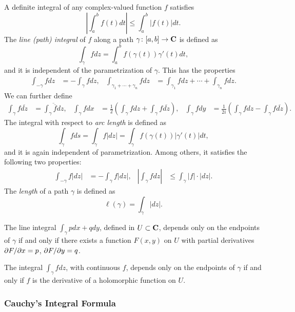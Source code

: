 A definite integral of any complex-valued function $f$ satisfies
\[
\left| \int_a^b f(t) d t \right| \leq \int_a^b |f(t)| d t.
\]
The \emph{line (path) integral} of $f$ along a path $\gamma \colon [a,b] \rightarrow \mathbf{C}$ is defined as
\[
\int_\gamma f d z = \int_a^b f(\gamma(t)) \gamma'(t) d t,
\]
and it is independent of the parametrization of $\gamma$. This has the properties
\begin{align*}
  \int_{-\gamma} f d z &= -\int_\gamma f d z, &
  \int_{\gamma_1 + \cdots + \gamma_n} f d z &= \int_{\gamma_1} f d z + \cdots + \int_{\gamma_n} f d z.
\end{align*}
We can further define
\begin{align*}
  \int_\gamma f \overline{d z} &= \overline{\int_\gamma \overline{f} d z}, &
  \int_\gamma f d x &= \frac{1}{2} \left( \int_\gamma f d z + \int_\gamma f \overline{d z} \right), &
  \int_\gamma f d y &= \frac{1}{2i} \left( \int_\gamma f d z - \int_\gamma f \overline{d z} \right).
\end{align*}
The integral with respect to \emph{arc length} is defined as
\[
\int_\gamma f d s = \int_\gamma f |d z| = \int_\gamma f(\gamma(t)) |\gamma'(t)| d t,
\]
and it is again independent of parametrization. Among others, it satisfies the following two properties:
\begin{align*}
  \int_{-\gamma} f |d z| &= -\int_\gamma f |d z|, &
  \left| \int_\gamma f d z \right| &\leq \int_\gamma |f| \cdot |d z|.
\end{align*}
The \emph{length} of a path $\gamma$ is defined as
\[
\ell(\gamma) = \int_\gamma |d z|.
\]

\begin{theorem}
  The line integral $\int_\gamma p d x + q d y$, defined in $U \subset \mathbf{C}$, depends only on the endpoints of $\gamma$ if and only if there exists a function $F(x,y)$ on $U$ with partial derivatives $\partial F/\partial x = p$, $\partial F/\partial y = q$.
\end{theorem}

\begin{corollary}
  The integral $\int_\gamma f d z$, with continuous $f$, depends only on the endpoints of $\gamma$ if and only if $f$ is the derivative of a holomorphic function on $U$.
\end{corollary}

\subsubsection{Cauchy's Integral Formula}

